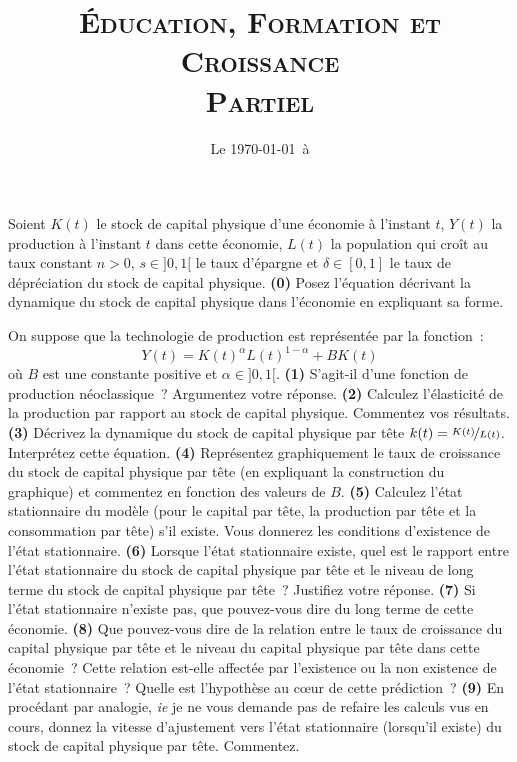 \documentclass[10pt,a4paper,notitlepage]{article}
\newcommand{\question}[1]{\textbf{(#1)}}
\begin{document}
\title{\textsc{Éducation, Formation et Croissance\\ \small{Partiel}}}
\date{Le \today\ à \thistime}

\maketitle

Soient $K(t)$ le stock de capital physique d'une économie à l'instant
$t$, $Y(t)$ la production à l'instant $t$ dans cette économie, $L(t)$ la population qui
croît au taux constant $n>0$, $s\in]0,1[$ le taux d'épargne et
$\delta\in[0,1]$ le taux de dépréciation du stock de capital
physique. \question{0} Posez l'équation décrivant la dynamique du
stock de capital physique dans l'économie en expliquant sa
forme.\newline

On suppose que la technologie de production est représentée par la fonction :
\[
Y(t) = K(t)^\alpha L(t)^{1-\alpha} + BK(t)
\]
où $B$ est une constante positive et $\alpha\in]0,1[$. \question{1}
S'agit-il d'une fonction de production néoclassique ? Argumentez votre
réponse. \question{2} Calculez l'élasticité de la production par
rapport au stock de capital physique. Commentez vos
résultats. \question{3} Décrivez la dynamique du stock de capital physique par
tête $k(t)=\nicefrac{K(t)}{L(t)}$. Interprétez cette
équation. \question{4} Représentez graphiquement le taux de croissance
du stock de capital physique par tête (en expliquant la construction
du graphique) et commentez en fonction des valeurs de
$B$. \question{5} Calculez l'état stationnaire du modèle (pour le
capital par tête, la production par tête et la consommation par tête)
s'il existe. Vous donnerez les conditions d'existence de l'état
stationnaire. \question{6} Lorsque l'état stationnaire existe, quel
est le rapport entre l'état stationnaire du stock de capital physique par tête
et le niveau de long terme du stock de capital physique par tête ? Justifiez votre
réponse. \question{7} Si l'état stationnaire n'existe pas, que
pouvez-vous dire du long terme de cette économie. \question{8} Que
pouvez-vous dire de la relation entre le taux de croissance du capital
physique par tête et le niveau du capital physique par tête dans cette économie ? Cette
relation est-elle affectée par l'existence ou la non existence de l'état
stationnaire ? Quelle est l'hypothèse au c\oe ur de cette prédiction ?
\question{9}  En procédant par analogie, \emph{ie} je ne
vous demande pas de refaire les calculs vus en cours, donnez la
vitesse d'ajustement vers l'état stationnaire (lorsqu'il existe) du stock
de capital physique par tête. Commentez.
\end{document}
